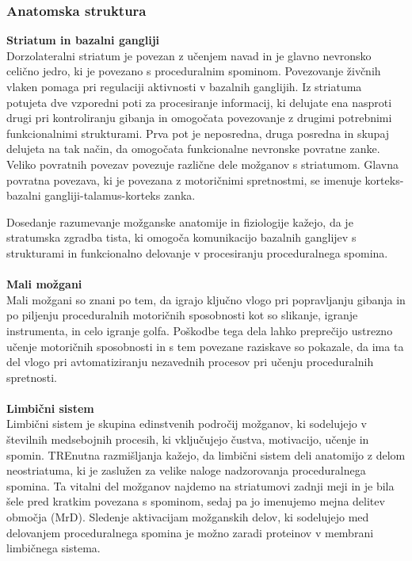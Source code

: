 \documentclass[10pt,a4paper]{article}
\begin{document}
\subsubsection{Anatomska struktura}
\textbf{Striatum in bazalni gangliji}\\
Dorzolateralni striatum je povezan z učenjem navad in je glavno nevronsko celično jedro, ki je povezano s proceduralnim spominom. Povezovanje živčnih vlaken pomaga pri regulaciji aktivnosti v bazalnih ganglijih. Iz striatuma potujeta dve vzporedni poti za procesiranje informacij, ki delujate ena nasproti drugi pri kontroliranju gibanja in omogočata povezovanje z drugimi potrebnimi funkcionalnimi strukturami. Prva pot je neposredna, druga posredna in skupaj delujeta na tak način, da omogočata funkcionalne nevronske povratne zanke. Veliko povratnih povezav povezuje različne dele možganov s striatumom. Glavna povratna povezava, ki je povezana z motoričnimi spretnostmi, se imenuje korteks-bazalni gangliji-talamus-korteks zanka.

Dosedanje razumevanje možganske anatomije in fiziologije kažejo, da je stratumska zgradba tista, ki omogoča komunikacijo bazalnih ganglijev s strukturami in funkcionalno delovanje v procesiranju proceduralnega spomina. 
\\
\\
\textbf{Mali možgani}\\
Mali možgani so znani po tem, da igrajo ključno vlogo pri popravljanju gibanja in po piljenju proceduralnih motoričnih sposobnosti kot so slikanje, igranje instrumenta, in celo igranje golfa. Poškodbe tega dela lahko preprečijo ustrezno učenje motoričnih sposobnosti in s tem povezane raziskave so pokazale, da ima ta del vlogo pri avtomatiziranju nezavednih procesov pri učenju proceduralnih spretnosti.
\\
\\ 
\textbf{Limbični sistem}\\
Limbični sistem je skupina edinstvenih področij možganov, ki sodelujejo v številnih medsebojnih procesih, ki vključujejo čustva, motivacijo, učenje in spomin. TREnutna razmišljanja kažejo, da limbični sistem deli anatomijo z delom neostriatuma, ki je zaslužen za velike naloge nadzorovanja proceduralnega spomina. Ta vitalni del možganov najdemo na striatumovi zadnji meji in je bila šele pred kratkim povezana s spominom, sedaj pa jo imenujemo mejna delitev območja (MrD). Sledenje aktivacijam možganskih delov, ki sodelujejo med delovanjem proceduralnega spomina je možno zaradi proteinov v membrani limbičnega sistema.
\end{document}
